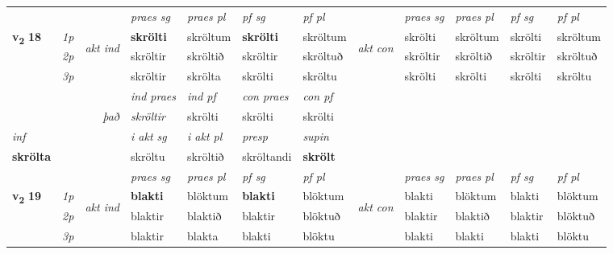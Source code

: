 \begin{longtable}[l]{X>{\footnotesize\itshape}llXXXXlXXXX}
\midrule

 & &   & \textit{praes sg}  & \textit{praes pl}    & \textit{ pf sg} & \textit{pf pl} & & \textit{praes sg}  & \textit{praes pl}    & \textit{pf sg} & \textit{pf pl }  \\ \cmidrule{4-7} \cmidrule{9-12}
 \multirow{2}{*}{{{\textbf{v{\textsubscript{2}}} \Large{\textbf{18}}}}}  & 1p & \multirow{3}{*}{\begin{turn}{90}\textit{akt ind}\end{turn}} & \textbf{skrölti} & skröltum & \textbf{skrölti} & skröltum & \multirow{3}{*}{\begin{turn}{90}\textit{akt con}\end{turn}} &skrölti & skröltum & skrölti & skröltum\\*
 & 2p &  &  skröltir  & skröltið & skröltir & skröltuð & & skröltir & skröltið & skröltir & skröltuð \\*
 & 3p &  & skröltir & skrölta & skrölti & skröltu & & skrölti & skrölti& skrölti & skröltu \\*
\cmidrule{4-7} \cmidrule{9-12}

   && &  \textit{ind praes} & \textit{ind pf} & \textit{con praes} & \textit{con pf} \\*
\multicolumn{3}{r}{\textit{það}} & skröltir & skrölti & skrölti & skrölti \\*

\cmidrule{4-7}
   {\textit{inf}} & &  & \textit{i akt sg} & \textit{i akt pl}   & \textit{presp} & \textit{supin}   \\*
  {\textbf{skrölta}} & && skröltu  & skröltið   & skröltandi &  \textbf{skrölt}   \\*

\midrule

 & &   & \textit{praes sg}  & \textit{praes pl}    & \textit{ pf sg} & \textit{pf pl} & & \textit{praes sg}  & \textit{praes pl}    & \textit{pf sg} & \textit{pf pl }  \\ \cmidrule{4-7} \cmidrule{9-12}
 \multirow{2}{*}{{{\textbf{v{\textsubscript{2}}} \Large{\textbf{19}}}}}  & 1p & \multirow{3}{*}{\begin{turn}{90}\textit{akt ind}\end{turn}} & \textbf{blakti} & blöktum & \textbf{blakti} & blöktum & \multirow{3}{*}{\begin{turn}{90}\textit{akt con}\end{turn}} &blakti & blöktum & blakti & blöktum\\*
 & 2p &  &  blaktir  & blaktið & blaktir & blöktuð & & blaktir & blaktið & blaktir & blöktuð \\*
 & 3p &  & blaktir & blakta & blakti & blöktu & & blakti & blakti& blakti & blöktu \\*
\cmidrule{4-7} \cmidrule{9-12}


\end{longtable}
